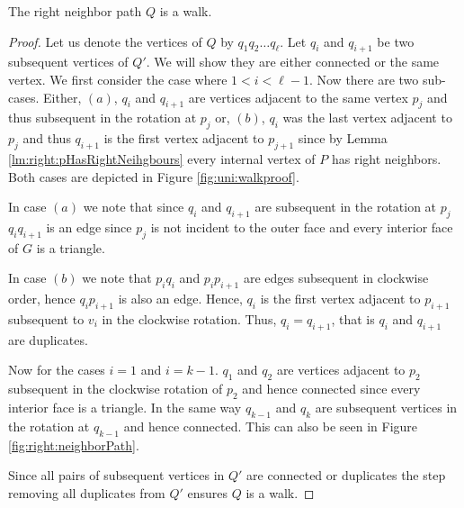     \begin{lemma}
      \label{lm:right:neighborWalk}
      The right neighbor path $Q$ is a walk.
    \end{lemma}
    \begin{proof}
      Let us denote the vertices of $Q$ by $q_1 q_2 \ldots q_\ell$.
      Let $q_i$ and $q_{i+1}$ be two subsequent vertices of $Q'$. We will show they are either connected or the same vertex. We first consider the case where $1 < i < \ell-1$.
      Now there are two sub-cases. Either, $(a)$, $q_i$ and $ q_{i+1}$ are vertices adjacent to the same vertex $p_j$ and thus subsequent in the rotation at $p_j$ or, $(b)$, $q_i$ was the last vertex adjacent to $p_j$ and thus $q_{i+1}$ is the first vertex adjacent to $p_{j+1}$ since by Lemma \ref{lm:right:pHasRightNeihgbours} every internal vertex of $P$ has right neighbors.
      Both cases are depicted in Figure \ref{fig:uni:walkproof}.

      In case $(a)$ we note that since $q_i$ and $q_{i+1}$ are subsequent in the rotation at $p_j$ $q_i q_{i+1}$ is an edge since $p_j$ is not incident to the outer face and every interior face of $G$ is a triangle.

      In case $(b)$ we note that $p_i q_i$ and $p_i p_{i+1}$ are edges subsequent in clockwise order, hence $q_{i} p_{i+1}$ is also an edge. Hence, $q_i$ is the first vertex adjacent to $p_{i+1}$ subsequent to $v_i$ in the clockwise rotation. Thus, $q_{i} = q_{i+1}$, that is $q_i$ and $q_{i+1}$ are duplicates.

      Now for the cases $i=1$ and $i=k-1$. $q_1$ and $q_2$ are vertices adjacent to $p_{2}$ subsequent in the clockwise rotation of ${p_2}$ and hence connected since every interior face is a triangle. In the same way $q_{k-1}$ and $q_k$ are subsequent vertices in the rotation at $q_{k-1}$ and hence connected. This can also be seen in Figure \ref{fig:right:neighborPath}.

      Since all pairs of subsequent vertices in $Q'$ are connected or duplicates the step removing all duplicates from $Q'$ ensures $Q$ is a walk.


\end{proof}

